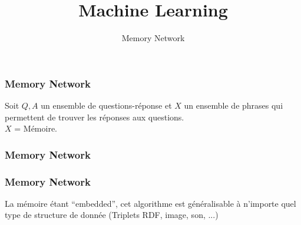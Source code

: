 \documentclass{formation}
\title{Machine Learning}
\subtitle{Memory Network}
\begin{document}
\maketitle

\begin{frame}
  \frametitle{Memory Network}
  Soit ${Q,A}$ un ensemble de questions-réponse et ${X}$ un ensemble de phrases qui permettent de trouver les réponses aux questions. \\
  ${X}$ = Mémoire. \\
\end{frame}

\begin{frame}
  \frametitle{Memory Network}
\end{frame}

\begin{frame}
  \frametitle{Memory Network}
  La mémoire étant ``embedded'', cet algorithme est généralisable à n'importe quel type de structure de donnée (Triplets RDF, image, son, ...)
\end{frame}
\end{document}
